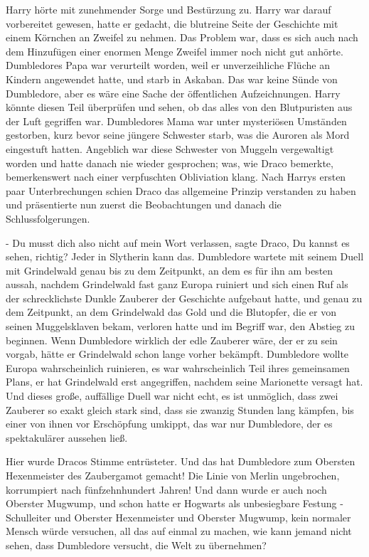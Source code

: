 Harry hörte mit zunehmender Sorge und Bestürzung zu. Harry war darauf
vorbereitet gewesen, hatte er gedacht, die blutreine Seite der Geschichte mit
einem Körnchen an Zweifel zu nehmen. Das Problem war, dass es sich auch nach dem
Hinzufügen einer enormen Menge Zweifel immer noch nicht gut anhörte. Dumbledores
Papa war verurteilt worden, weil er unverzeihliche Flüche an Kindern angewendet
hatte, und starb in Askaban. Das war keine Sünde von Dumbledore, aber es wäre
eine Sache der öffentlichen Aufzeichnungen. Harry könnte diesen Teil überprüfen
und sehen, ob das alles von den Blutpuristen aus der Luft gegriffen war.
Dumbledores Mama war unter mysteriösen Umständen gestorben, kurz bevor seine
jüngere Schwester starb, was die Auroren als Mord eingestuft hatten. Angeblich
war diese Schwester von Muggeln vergewaltigt worden und hatte danach nie wieder
gesprochen; was, wie Draco bemerkte, bemerkenswert nach einer verpfuschten
Obliviation klang. Nach Harrys ersten paar Unterbrechungen schien Draco das
allgemeine Prinzip verstanden zu haben und präsentierte nun zuerst die
Beobachtungen und danach die Schlussfolgerungen.

\glqq{}- Du musst dich also nicht auf mein Wort verlassen\grqq{}, sagte Draco,
\glqq{}Du kannst es sehen, richtig? Jeder in Slytherin kann das. Dumbledore
wartete mit seinem Duell mit Grindelwald genau bis zu dem Zeitpunkt, an dem es
für ihn am besten aussah, nachdem Grindelwald fast ganz Europa ruiniert und sich
einen Ruf als der schrecklichste Dunkle Zauberer der Geschichte aufgebaut hatte,
und genau zu dem Zeitpunkt, an dem Grindelwald das Gold und die Blutopfer, die
er von seinen Muggelsklaven bekam, verloren hatte und im Begriff war, den
Abstieg zu beginnen. Wenn Dumbledore wirklich der edle Zauberer wäre, der er zu
sein vorgab, hätte er Grindelwald schon lange vorher bekämpft. Dumbledore wollte
Europa wahrscheinlich ruinieren, es war wahrscheinlich Teil ihres gemeinsamen
Plans, er hat Grindelwald erst angegriffen, nachdem seine Marionette versagt
hat. Und dieses große, auffällige Duell war nicht echt, es ist unmöglich, dass
zwei Zauberer so exakt gleich stark sind, dass sie zwanzig Stunden lang kämpfen,
bis einer von ihnen vor Erschöpfung umkippt, das war nur Dumbledore, der es
spektakulärer aussehen ließ.\grqq{}

Hier wurde Dracos Stimme entrüsteter. \glqq{}Und das hat Dumbledore zum Obersten
Hexenmeister des Zaubergamot gemacht! Die Linie von Merlin ungebrochen,
korrumpiert nach fünfzehnhundert Jahren! Und dann wurde er auch noch Oberster
Mugwump, und schon hatte er Hogwarts als unbesiegbare Festung - Schulleiter und
Oberster Hexenmeister und Oberster Mugwump, kein normaler Mensch würde
versuchen, all das auf einmal zu machen, wie kann jemand nicht sehen, dass
Dumbledore versucht, die Welt zu übernehmen?\grqq{}

